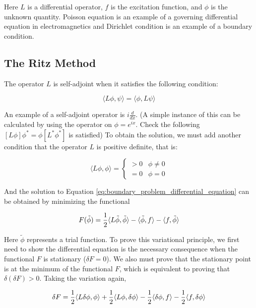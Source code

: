 \documentclass[a4paper,12pt]{report}
\begin{document}
Here $L$ is a differential operator, $f$ is the excitation function,
and $\phi$ is the unknown quantity.
Poisson equation is an example of a governing differential equation in electromagnetics
and Dirichlet condition is an example of a boundary condition.

\subsection{The Ritz Method}

The operator $L$ is self-adjoint when it satisfies the following condition:

\begin{equation}\label{eq:boundary_problem_differential_equation}
  \langle L\phi, \psi \rangle = \langle\phi, L\psi\rangle
\end{equation}

An example of a self-adjoint operator is $i\frac{d}{dx}$.
(A simple instance of this can be calculated by using the operator
on $\phi = e^{ix}$.
Check the following $[L\phi]\phi^*=\phi [L^*\phi^*]$ is satisfied)
To obtain the solution,
we must add another condition that the operator $L$ is positive definite,
that is:

\begin{equation}
  \langle L\phi, \phi\rangle =
  \begin{cases}
    > 0 & \phi \neq 0 \\
    = 0 & \phi = 0
  \end{cases}
\end{equation}

And the solution to Equation \ref{eq:boundary_problem_differential_equation}
can be obtained by minimizing the functional

\begin{equation}
  F(\tilde{\phi}) = \frac{1}{2}\langle L \tilde{\phi}, \tilde{\phi}\rangle \\
  - \langle \tilde{\phi}, f \rangle - \langle f, \tilde{\phi} \rangle
\end{equation}

Here $\tilde{\phi}$ represents a trial function.
To prove this variational principle,
we first need to show the differential equation is the necessary consequence when the functional $F$ is stationary
($\delta F = 0$).
We also must prove that the stationary point is at the minimum of the functional $F$,
which is equivalent to proving that $\delta(\delta F) > 0$.
Taking the variation again,

\begin{equation}
  \delta F = \frac{1}{2}\langle L\delta\phi,\phi \rangle + \frac{1}{2}\langle L\phi,\delta\phi \rangle \\
              - \frac{1}{2}\langle \delta\phi,f \rangle - \frac{1}{2}\langle f, \delta\phi \rangle
\end{equation}
\end{document}
